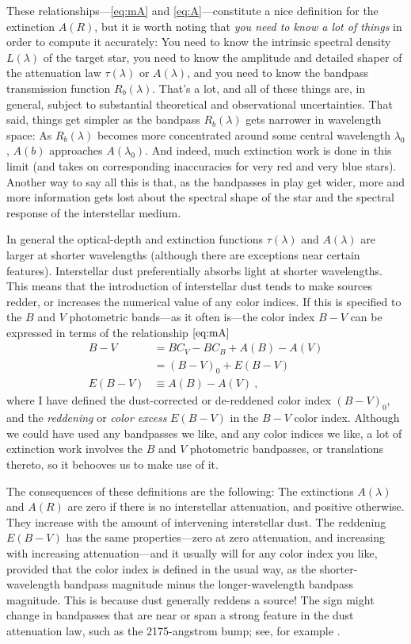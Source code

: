 \documentclass[10pt]{article}
\begin{document}
These relationships---\eqref{eq:mA} and \eqref{eq:A}---constitute a nice definition for the extinction $A(R)$, but it is worth noting that \emph{you need to know a lot of things} in order to compute it accurately:
You need to know the intrinsic spectral density $L(\lambda)$ of the target star, you need to know the amplitude and detailed shaper of the attenuation law $\tau(\lambda)$ or $A(\lambda)$, and you need to know the bandpass transmission function $R_b(\lambda)$.
That's a lot, and all of these things are, in general, subject to substantial theoretical and observational uncertainties.
That said, things get simpler as the bandpass $R_b(\lambda)$ gets narrower in wavelength space:
As $R_b(\lambda)$ becomes more concentrated around some central wavelength $\lambda_0$, $A(b)$ approaches $A(\lambda_0)$.
And indeed, much extinction work is done in this limit (and takes on corresponding inaccuracies for very red and very blue stars).
Another way to say all this is that, as the bandpasses in play get wider, more and more information gets lost about the spectral shape of the star and the spectral response of the interstellar medium.

In general the optical-depth and extinction functions $\tau(\lambda)$ and $A(\lambda)$ are larger at shorter wavelengths (although there are exceptions near certain features).
Interstellar dust preferentially absorbs light at shorter wavelengths.
This means that the introduction of interstellar dust tends to make sources redder, or increases the numerical value of any color indices.
If this is specified to the $B$ and $V$ photometric bands---as it often is---the color index $B-V$ can be expressed in terms of the relationship $\eqref{eq:mA}$
\begin{align}
    B - V &= BC_V - BC_B + A(B) - A(V)\\
          &= (B - V)_0 + E(B - V)\\
    E(B - V) &\equiv A(B) - A(V) ~,
\end{align}
where I have defined the dust-corrected or de-reddened color index $(B-V)_0$,
and the \emph{reddening} or \emph{color excess} $E(B-V)$ in the $B-V$ color index.
Although we could have used any bandpasses we like, and any color indices we like,
a lot of extinction work involves the $B$ and $V$ photometric bandpasses, or translations thereto, so it behooves us to make use of it.

The consequences of these definitions are the following:
The extinctions $A(\lambda)$ and $A(R)$ are zero if there is no interstellar attenuation, and positive otherwise.
They increase with the amount of intervening interstellar dust.
The reddening $E(B-V)$ has the same properties---zero at zero attenuation, and increasing with increasing attenuation---and it usually will for any color index you like, provided that the color index is defined in the usual way, as the shorter-wavelength bandpass magnitude minus the longer-wavelength bandpass magnitude.
This is because dust generally reddens a source!
The sign might change in bandpasses that are near or span a strong feature in the dust attenuation law, such as the 2175-angstrom bump; see, for example \cite{extinction}.
\end{document}
